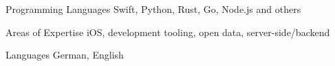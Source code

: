 

\begin{cvskills}

  \cvskill
    {Programming Languages} %
    {Swift, Python, Rust, Go, Node.js and others} %

  \cvskill
    {Areas of Expertise} %
    {iOS, development tooling, open data, server-side/backend} %

  \cvskill
    {Languages} %
    {German, English} %

\end{cvskills}
